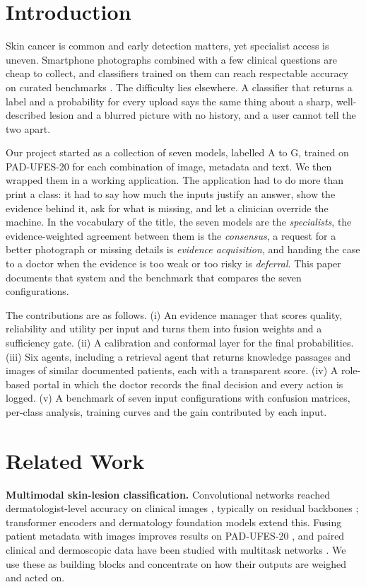 \documentclass[conference]{IEEEtran}
\begin{document}
\section{Introduction}
Skin cancer is common and early detection matters, yet specialist access is uneven. Smartphone photographs combined with a few clinical questions are cheap to collect, and classifiers trained on them can reach respectable accuracy on curated benchmarks \cite{esteva2017,pacheco2020}. The difficulty lies elsewhere. A classifier that returns a label and a probability for every upload says the same thing about a sharp, well-described lesion and a blurred picture with no history, and a user cannot tell the two apart.

Our project started as a collection of seven models, labelled A to G, trained on PAD-UFES-20 \cite{pacheco2020} for each combination of image, metadata and text. We then wrapped them in a working application. The application had to do more than print a class: it had to say how much the inputs justify an answer, show the evidence behind it, ask for what is missing, and let a clinician override the machine. In the vocabulary of the title, the seven models are the \emph{specialists}, the evidence-weighted agreement between them is the \emph{consensus}, a request for a better photograph or missing details is \emph{evidence acquisition}, and handing the case to a doctor when the evidence is too weak or too risky is \emph{deferral}. This paper documents that system and the benchmark that compares the seven configurations.

The contributions are as follows. (i) An evidence manager that scores quality, reliability and utility per input and turns them into fusion weights and a sufficiency gate. (ii) A calibration and conformal layer for the final probabilities. (iii) Six agents, including a retrieval agent that returns knowledge passages and images of similar documented patients, each with a transparent score. (iv) A role-based portal in which the doctor records the final decision and every action is logged. (v) A benchmark of seven input configurations with confusion matrices, per-class analysis, training curves and the gain contributed by each input.

\section{Related Work}
\textbf{Multimodal skin-lesion classification.} Convolutional networks reached dermatologist-level accuracy on clinical images \cite{esteva2017}, typically on residual backbones \cite{he2016}; transformer encoders \cite{dosovitskiy2021} and dermatology foundation models \cite{yan2025} extend this. Fusing patient metadata with images improves results on PAD-UFES-20 \cite{pacheco2021}, and paired clinical and dermoscopic data have been studied with multitask networks \cite{kawahara2019}. We use these as building blocks and concentrate on how their outputs are weighed and acted on.
\end{document}
